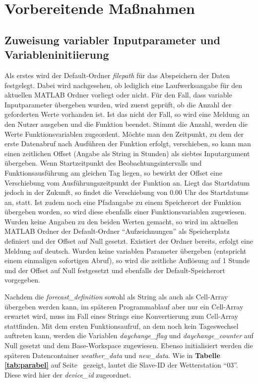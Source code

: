 \section{Vorbereitende Maßnahmen}
\subsection{Zuweisung variabler Inputparameter und Variableninitiierung}
Als erstes wird der Default-Ordner \textit{filepath} für das Abspeichern der Daten festgelegt. Dabei wird nachgesehen, ob lediglich eine Laufwerksangabe für den aktuellen MATLAB Ordner vorliegt oder nicht. Für den Fall, dass variable Inputparameter übergeben wurden, wird zuerst geprüft, ob die Anzahl der geforderten Werte vorhanden ist. Ist das nicht der Fall, so wird eine Meldung an den Nutzer ausgeben und die Funktion beendet. Stimmt die Anzahl, werden die Werte Funktionsvariablen zugeordent. Möchte man den Zeitpunkt, zu dem der erste Datenabruf nach Ausführen der Funktion erfolgt, verschieben, so kann man einen zeitlichen Offset (Angabe als String in Stunden) als siebtes Inputargument übergeben. Wenn Startzeitpunkt des Beobachtungsintervalls und Funktionsausführung am gleichen Tag liegen, so bewirkt der Offset eine Verschiebung vom Ausführungszeitpunkt der Funktion an. Liegt das Startdatum jedoch in der Zukunft, so findet die Verschiebung von 0.00 Uhr des Startdatums an, statt. Ist zudem noch eine Pfadangabe zu einem Speicherort der Funktion übergeben worden, so wird diese ebenfalls einer Funktionsvariablen zugewiesen. Wurden keine Angaben zu den beiden Werten gemacht, so wird im aktuellen MATLAB Ordner der Default-Ordner \enquote{Aufzeichnungen} als Speicherplatz definiert und der Offset auf Null gesetzt. Existiert der Ordner bereits, erfolgt eine Meldung auf deutsch. Wurden keine variablen Parameter übergeben (entspricht einem einmaligen sofortigen Abruf), so wird die zeitliche Auflösung auf 1 Stunde und der Offset auf Null festgesetzt und ebenfalls der Default-Speicherort vorgegeben. 

Nachdem die \textit{forecast\_definition} sowohl als String als auch als Cell-Array übergeben werden kann, im späteren Programmablauf aber nur ein Cell-Array erwartet wird, muss im Fall eines Strings eine Konvertierung zum Cell-Array stattfinden.\label{sendloop} Mit dem ersten Funktionsaufruf, an dem noch kein Tageswechsel auftreten kann, werden die Variablen \textit{daychange\_flag} und \textit{daychange\_counter} auf Null gesetzt und dem Base-Workspace zugewiesen. Ebenso initialisiert werden die späteren Datencontainer \textit{weather\_data} und \textit{new\_data}. Wie in \textbf{Tabelle \ref{tab:parabel}} auf Seite~\pageref{tab:parabel} gezeigt, lautet die Slave-ID der Wetterstation \enquote{03}. Diese wird hier der \textit{device\_id} zugeordnet. 
   
